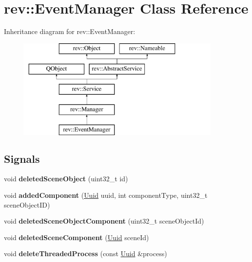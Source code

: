 \hypertarget{classrev_1_1_event_manager}{}\section{rev\+::Event\+Manager Class Reference}
\label{classrev_1_1_event_manager}
Inheritance diagram for rev\+::Event\+Manager\+:\begin{figure}[H]
\begin{center}
\leavevmode
\includegraphics[height=5.000000cm]{classrev_1_1_event_manager}
\end{center}
\end{figure}
\subsection*{Signals}
\begin{DoxyCompactItemize}
\item 
\mbox{\label{classrev_1_1_event_manager_a01ee937e8aa46c20322cf4004cc278c4}} 
void {\bfseries deleted\+Scene\+Object} (uint32\+\_\+t id)
\item 
\mbox{\label{classrev_1_1_event_manager_ac93a622f86dc385fef13e4ac27a82e70}} 
void {\bfseries added\+Component} (\mbox{\hyperlink{classrev_1_1_uuid}{Uuid}} uuid, int component\+Type, uint32\+\_\+t scene\+Object\+ID)
\item 
\mbox{\label{classrev_1_1_event_manager_a7ea1955ed861798451e7061b0abb6719}} 
void {\bfseries deleted\+Scene\+Object\+Component} (uint32\+\_\+t scene\+Object\+Id)
\item 
\mbox{\label{classrev_1_1_event_manager_a422141daf352d29411bfe516723719cb}} 
void {\bfseries deleted\+Scene\+Component} (\mbox{\hyperlink{classrev_1_1_uuid}{Uuid}} scene\+Id)
\item 
\mbox{\label{classrev_1_1_event_manager_a19ffa58f09be060e52ed279f2b5ebfdb}} 
void {\bfseries delete\+Threaded\+Process} (const \mbox{\hyperlink{classrev_1_1_uuid}{Uuid}} \&process)
\end{DoxyCompactItemize}
